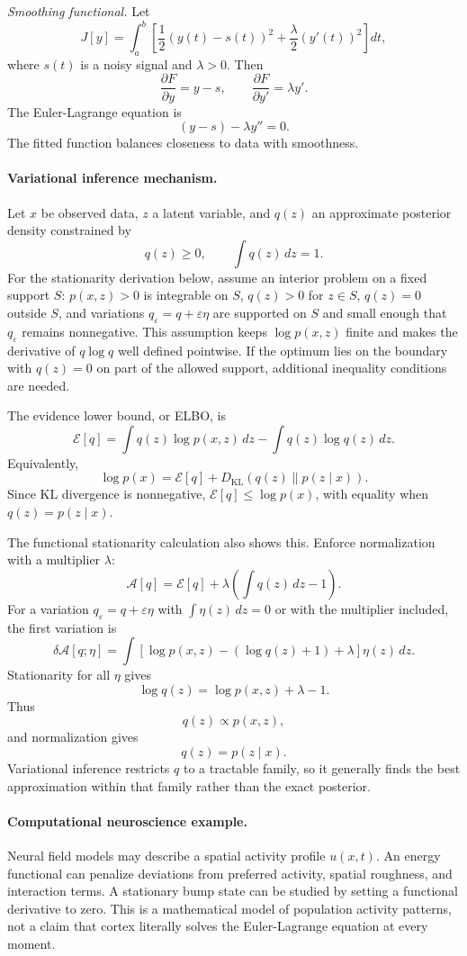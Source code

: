 \emph{Smoothing functional.} Let
\[
J[y]=\int_a^b
\left[
\frac12(y(t)-s(t))^2+\frac{\lambda}{2}(y'(t))^2
\right]dt,
\]
where \(s(t)\) is a noisy signal and \(\lambda>0\). Then
\[
\frac{\partial F}{\partial y}=y-s,
\qquad
\frac{\partial F}{\partial y'}=\lambda y'.
\]
The Euler-Lagrange equation is
\[
(y-s)-\lambda y''=0.
\]
The fitted function balances closeness to data with smoothness.

\paragraph{Variational inference mechanism.}
Let \(x\) be observed data, \(z\) a latent variable, and \(q(z)\) an approximate posterior density constrained by
\[
q(z)\ge 0,\qquad \int q(z)\,dz=1.
\]
For the stationarity derivation below, assume an interior problem on a fixed support \(S\): \(p(x,z)>0\) is integrable on \(S\), \(q(z)>0\) for \(z\in S\), \(q(z)=0\) outside \(S\), and variations \(q_\varepsilon=q+\varepsilon\eta\) are supported on \(S\) and small enough that \(q_\varepsilon\) remains nonnegative. This assumption keeps \(\log p(x,z)\) finite and makes the derivative of \(q\log q\) well defined pointwise. If the optimum lies on the boundary with \(q(z)=0\) on part of the allowed support, additional inequality conditions are needed.

The evidence lower bound, or ELBO, is
\[
\mathcal E[q]
=\int q(z)\log p(x,z)\,dz-\int q(z)\log q(z)\,dz.
\]
Equivalently,
\[
\log p(x)=\mathcal E[q]+D_{\mathrm{KL}}(q(z)\|p(z\mid x)).
\]
Since KL divergence is nonnegative, \(\mathcal E[q]\le \log p(x)\), with equality when \(q(z)=p(z\mid x)\).

The functional stationarity calculation also shows this. Enforce normalization with a multiplier \(\lambda\):
\[
\mathcal A[q]
=\mathcal E[q]+\lambda\left(\int q(z)\,dz-1\right).
\]
For a variation \(q_\varepsilon=q+\varepsilon\eta\) with \(\int\eta(z)\,dz=0\) or with the multiplier included, the first variation is
\[
\delta\mathcal A[q;\eta]
=\int
\left[
\log p(x,z)-(\log q(z)+1)+\lambda
\right]\eta(z)\,dz.
\]
Stationarity for all \(\eta\) gives
\[
\log q(z)=\log p(x,z)+\lambda-1.
\]
Thus
\[
q(z)\propto p(x,z),
\]
and normalization gives
\[
q(z)=p(z\mid x).
\]
Variational inference restricts \(q\) to a tractable family, so it generally finds the best approximation within that family rather than the exact posterior.

\paragraph{Computational neuroscience example.}
Neural field models may describe a spatial activity profile \(u(x,t)\). An energy functional can penalize deviations from preferred activity, spatial roughness, and interaction terms. A stationary bump state can be studied by setting a functional derivative to zero. This is a mathematical model of population activity patterns, not a claim that cortex literally solves the Euler-Lagrange equation at every moment.

